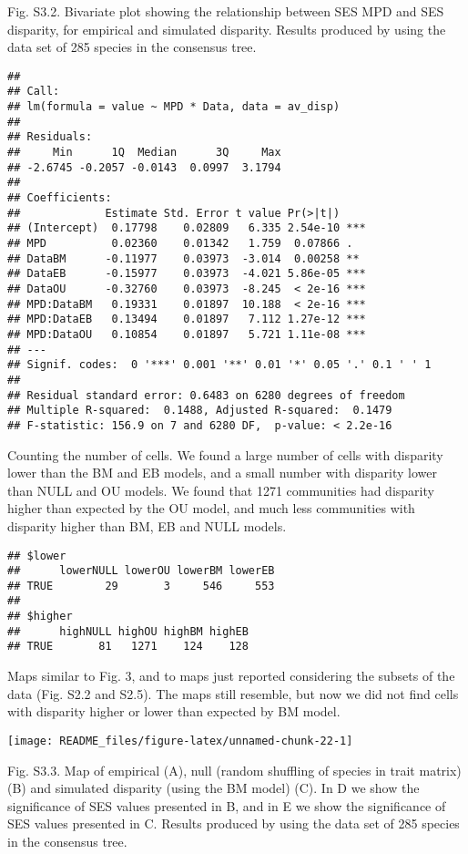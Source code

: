 \documentclass[
]{article}
\begin{document}
Fig. S3.2. Bivariate plot showing the relationship between SES MPD and
SES disparity, for empirical and simulated disparity. Results produced
by using the data set of 285 species in the consensus tree.

\begin{verbatim}
## 
## Call:
## lm(formula = value ~ MPD * Data, data = av_disp)
## 
## Residuals:
##     Min      1Q  Median      3Q     Max 
## -2.6745 -0.2057 -0.0143  0.0997  3.1794 
## 
## Coefficients:
##             Estimate Std. Error t value Pr(>|t|)    
## (Intercept)  0.17798    0.02809   6.335 2.54e-10 ***
## MPD          0.02360    0.01342   1.759  0.07866 .  
## DataBM      -0.11977    0.03973  -3.014  0.00258 ** 
## DataEB      -0.15977    0.03973  -4.021 5.86e-05 ***
## DataOU      -0.32760    0.03973  -8.245  < 2e-16 ***
## MPD:DataBM   0.19331    0.01897  10.188  < 2e-16 ***
## MPD:DataEB   0.13494    0.01897   7.112 1.27e-12 ***
## MPD:DataOU   0.10854    0.01897   5.721 1.11e-08 ***
## ---
## Signif. codes:  0 '***' 0.001 '**' 0.01 '*' 0.05 '.' 0.1 ' ' 1
## 
## Residual standard error: 0.6483 on 6280 degrees of freedom
## Multiple R-squared:  0.1488, Adjusted R-squared:  0.1479 
## F-statistic: 156.9 on 7 and 6280 DF,  p-value: < 2.2e-16
\end{verbatim}

Counting the number of cells. We found a large number of cells with
disparity lower than the BM and EB models, and a small number with
disparity lower than NULL and OU models. We found that 1271 communities
had disparity higher than expected by the OU model, and much less
communities with disparity higher than BM, EB and NULL models.

\begin{verbatim}
## $lower
##      lowerNULL lowerOU lowerBM lowerEB
## TRUE        29       3     546     553
## 
## $higher
##      highNULL highOU highBM highEB
## TRUE       81   1271    124    128
\end{verbatim}

Maps similar to Fig. 3, and to maps just reported considering the
subsets of the data (Fig. S2.2 and S2.5). The maps still resemble, but
now we did not find cells with disparity higher or lower than expected
by BM model.

\begin{center}\texttt{[image: README\_files/figure-latex/unnamed-chunk-22-1]} \end{center}

Fig. S3.3. Map of empirical (A), null (random shuffling of species in
trait matrix) (B) and simulated disparity (using the BM model) (C). In D
we show the significance of SES values presented in B, and in E we show
the significance of SES values presented in C. Results produced by using
the data set of 285 species in the consensus tree.
\end{document}
